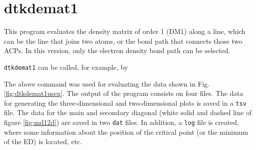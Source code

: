 \section{dtkdemat1}

This program evaluates the density matrix of order 1 (DM1) along a line, which can be the line that joins two atoms, or the bond path that connects those two ACPs. In this version, only the electron density bond path can be selected. 

\texttt{dtkdemat1} can be called, for example, by\\

The above command was used for evaluating the data shown in Fig. \ref{fig:dtkdemat1usex}. The output of the program consists on four files. The data for generating the three-dimensional and two-dimensional plots is saved in a \texttt{tsv} file. The data for the main and secondary diagonal (white solid and dashed line of figure \ref{fig:md12d}) are saved in two \texttt{dat} files. In addition, a \texttt{log} file is created, where some information about the position of the critical point (or the minimum of the ED) is located, etc.
%
